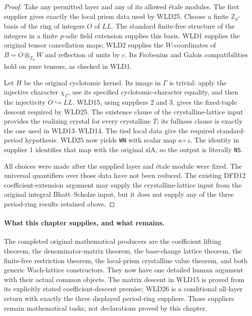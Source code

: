 \documentclass[11pt,a4paper]{article}
\numberwithin{equation}{section}
\theoremstyle{remark}\newtheorem{remark}[theorem]{Remark}
\begin{document}
\begin{proof}
Take any permitted layer and any of its allowed \'etale modules.
The first supplier gives exactly the local prism data used by
WLD25. Choose a finite $\mathbb Z_p$-basis of the ring of integers
$O$ of $LL$. The standard finite-free structure of the integers
in a finite $p$-adic field extension supplies this basis.
WLD1 supplies the original tensor cancellation maps; WLD2 supplies
the $W$-coordinates of $B=O\otimes_{\mathbb Z_p}W$ and reflection
of units by $c$. Its Frobenius and Galois compatibilities hold on
pure tensors, as checked in WLD1.

Let $H$ be the original cyclotomic kernel. Its image in $\Gamma$
is trivial: apply the injective character $\chi_\Gamma$, use
its specified cyclotomic-character equality, and then the
injectivity $O\hookrightarrow LL$.
WLD15, using suppliers 2 and 3, gives the fixed-tuple descent
required by WLD25. The existence clause of the crystalline-lattice
input provides the realizing crystal for every crystalline $T$;
its fullness clause is exactly the one used in WLD13--WLD14.
The tied local data give the required standard-period hypothesis.
WLD25 now yields \texttt{WN} with scalar map $a\circ z$.
The identity in supplier 1 identifies that map with the original
$\mathrm{zlA}$, so the output is literally \texttt{NS}.

All choices were made after the supplied layer and \'etale module
were fixed. The universal quantifiers over those data have not
been reduced. The existing DFD12 coefficient-extension argument
may supply the crystalline-lattice input from the original
integral Bhatt--Scholze input, but it does not supply any of the
three period-ring results retained above.
\end{proof}

\paragraph{What this chapter supplies, and what remains.}
The completed original mathematical producers are the coefficient
lifting theorem, the denominator-matrix theorem, the base-change
lattice theorem, the finite-free restriction theorem, the local-prism
crystalline value theorem, and both generic Wach-lattice constructors.
They now have one detailed human argument with their actual common
objects. The matrix descent in WLD15 is proved from its explicitly
stated coefficient-descent premise; WLD26 is a conditional all-layer
return with exactly the three displayed period-ring suppliers.
Those suppliers remain mathematical tasks, not declarations proved
by this chapter.
\end{document}
